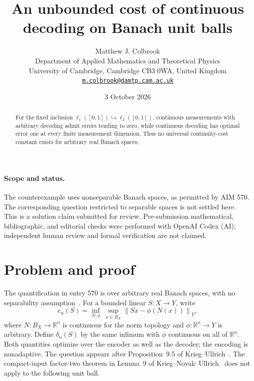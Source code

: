 \documentclass[11pt,a4paper]{article}
\theoremstyle{remark}
\newcommand{\R}{\mathbb R}
\newcommand{\norm}[1]{\left\lVert #1\right\rVert}
\begin{document}
\title{An unbounded cost of continuous decoding on Banach unit balls}
\author{Matthew J. Colbrook\\[3pt]\small Department of Applied Mathematics and Theoretical Physics\\\small University of Cambridge, Cambridge CB3 0WA, United Kingdom\\\small\href{mailto:m.colbrook@damtp.cam.ac.uk}{\texttt{m.colbrook@damtp.cam.ac.uk}}}
\date{3 October 2026}
\maketitle
\begin{abstract}For the fixed inclusion $\ell_1([0,1])\hookrightarrow\ell_2([0,1])$, continuous measurements with arbitrary decoding admit errors tending to zero, while continuous decoding has optimal error one at every finite measurement dimension. Thus no universal continuity-cost constant exists for arbitrary real Banach spaces.\end{abstract}
\paragraph{Scope and status.} The counterexample uses nonseparable Banach spaces, as permitted by AIM 570. The corresponding question restricted to separable spaces is not settled here. This is a solution claim submitted for review. Pre-submission mathematical, bibliographic, and editorial checks were performed with OpenAI Codex (AI); independent human review and formal verification are not claimed.

\section{Problem and proof}\label{sec:decoder}

The quantification in entry 570 is over arbitrary real Banach spaces, with no separability assumption~\cite{repo570}. For a bounded linear $S:X\to Y$, write
\[
 e_n(S)=\inf_{N,\phi}\ \sup_{x\in B_X}\norm{Sx-\phi(N(x))}_Y,
\]
where $N:B_X\to\R^n$ is continuous for the norm topology and $\phi:\R^n\to Y$ is arbitrary. Define $\delta_n(S)$ by the same infimum with $\phi$ continuous on all of $\R^n$. Both quantities optimize over the encoder as well as the decoder; the encoding is nonadaptive. The question appears after Proposition~9.5 of Krieg--Ullrich~\cite{ku}. The compact-input factor-two theorem in Lemma~9 of Krieg--Novak--Ullrich~\cite{knu} does not apply to the following unit ball.
\end{document}
